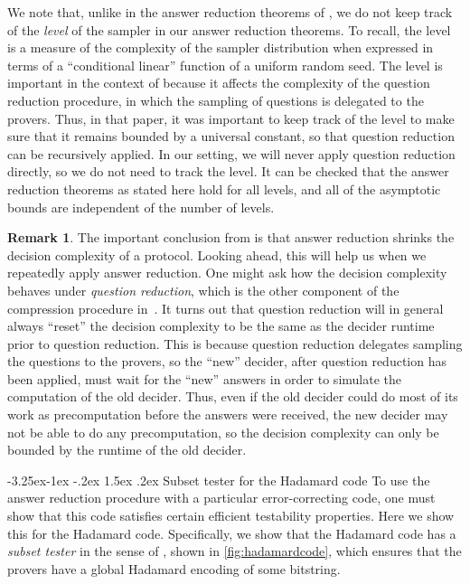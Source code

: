 \documentclass[10pt,a4paper]{article}
\makeatletter
\renewcommand{\subsection}{\@startsection{subsection}{2}{\z@}%
             {-3.25ex\@plus -1ex \@minus -.2ex}%
             {1.5ex \@plus .2ex}%
             {\normalfont\large\scshape\bfseries}}
\theoremstyle{plain}
\theoremstyle{definition}
\newtheorem{remark}[theorem]{Remark}
\newcommand{\1}{\mathbb{1}} %
\makeatother
\begin{document}
We note that, unlike in the answer reduction theorems of \cite{JNVWY'20}, we do not keep track of the \emph{level} of the sampler in our answer reduction theorems. To recall, the level is a measure of the complexity of the sampler distribution when expressed in terms of a ``conditional linear'' function of a uniform random seed. The level is important in the context of \cite{JNVWY'20} because it affects the complexity of the question reduction procedure, in which the sampling of questions is delegated to the provers. Thus, in that paper, it was important to keep track of the level to make sure that it remains bounded by a universal constant, so that question reduction can be recursively applied. In our setting, we will never apply question reduction directly, so we do not need to track the level. It can be checked that the answer reduction theorems as stated here hold for all levels, and all of the asymptotic bounds are independent of the number of levels.

\begin{remark}\label{rem:qr-decision-complexity}
The important conclusion from  is that answer reduction shrinks the decision complexity of a protocol. Looking ahead, this will help us when we repeatedly apply answer reduction. One might ask how the decision complexity behaves under \emph{question reduction}, which is the other component of the compression procedure in~\cite{JNVWY'20}. It turns out that question reduction will in general always ``reset'' the decision complexity to be the same as the decider runtime prior to question reduction. This is because question reduction delegates sampling the questions to the provers, so the ``new'' decider, after question reduction has been applied, must wait for the ``new'' answers in order to simulate the computation of the old decider. Thus, even if the old decider could do most of its work as precomputation before the answers were received, the new decider may not be able to do any precomputation, so the decision complexity can only be bounded by the runtime of the old decider.
\end{remark}


\subsection{Subset tester for the Hadamard code}
\label{sec:subset_tester}
To use the \cite{neexp} answer reduction procedure with a particular error-correcting code, one must show that this code satisfies certain efficient testability properties. Here we show this for the Hadamard code. Specifically, we show that the Hadamard code has a \emph{subset tester} in the sense of \cite[Section 16]{neexp}, shown in \cref{fig:hadamardcode}, which ensures that the provers have a global Hadamard encoding of some bitstring.
\end{document}
